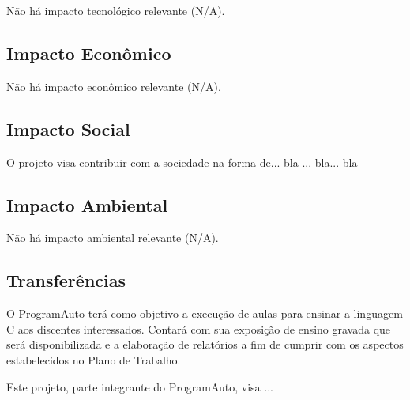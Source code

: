 \documentclass[a4paper,12pt]{article} %
\begin{document}
Não há impacto tecnológico relevante (N/A).


\subsection{Impacto Econômico}

Não há impacto econômico relevante (N/A).


\subsection{Impacto Social}

O projeto visa contribuir com a sociedade na forma de... bla ... bla... bla


\subsection{Impacto Ambiental}

Não há impacto ambiental relevante (N/A).


\subsection{Transferências}

O ProgramAuto terá como objetivo a execução de aulas para ensinar a linguagem C aos discentes interessados. Contará com sua exposição de ensino gravada que será disponibilizada e a elaboração de relatórios a fim de cumprir com os aspectos estabelecidos no Plano de Trabalho.

Este projeto, parte integrante do ProgramAuto, visa ...



\end{document}
